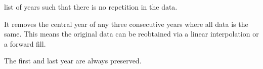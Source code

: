 \documentclass[letterpaper,10pt,english]{sphinxmanual}
\begin{document}

\begin{fulllineitems}
\label{\detokenize{api:muse.utilities.avoid_repetitions}}
list of years such that there is no repetition in the data.

It removes the central year of any three consecutive years where all data is
the same. This means the original data can be reobtained via a linear
interpolation or a forward fill.

The first and last year are always preserved.

\end{fulllineitems}

\end{document}
